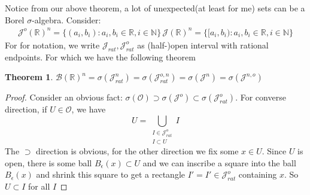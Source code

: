 \documentclass{article}
\newtheorem{theorem}{Theorem}[section]
\theoremstyle{definition}
\newcommand{\m}[1]{$ #1 $}
\begin{document}
Notice from our above theorem, a lot of unexpected(at least for me) sets can be a Borel \m{\sigma}-algebra. Consider: 
\begin{align*}
	\mathscr{J}^{o}(\mathbb{R})^{n} = \{(a_i,b_i):a_i,b_i \in \mathbb{R}, i \in \mathbb{N}\} \,
        \mathscr{J}(\mathbb{R})^{n} = \{[a_i,b_i):a_i,b_i \in \mathbb{R}, i \in \mathbb{N}\} 
\end{align*}
For for notation, we write \m{\mathscr{J}_{rat},\mathscr{J}^{o}_{rat}} as (half-)open interval with rational endpoints. For which we have the following theorem
\begin{theorem}
	\m{\mathscr{B}(\mathbb{R})^n = \sigma(\mathscr{J}^{n}_{rat}) =  \sigma(\mathscr{J}^{o,n}_{rat}) =  \sigma(\mathscr{J}^{n}) =  \sigma(\mathscr{J}^{n,o}) }
\end{theorem}
\begin{proof}
	Consider an obvious fact: \m{\sigma(\mathscr{O}) \supset \sigma(\mathscr{J}^{o}) \subset \sigma(\mathscr{J}^{o}_{rat}) }. For converse direction, if \m{U \in \mathscr{O}}, we have 
	\begin{equation*}
		U = \bigcup_{\substack{I \in \mathscr{J}^{o}_{rat} \\ I \subset U}} I
	\end{equation*}
	The \m{ \supset} direction is obvious, for the other direction we fix some \m{x \in U}. Since \m{U} is open, there is some ball \m{ B_{\epsilon}(x) \subset U} and we can inscribe a square into the ball \m{ B_{\epsilon}(x)} and shrink this square to get a rectangle \m{ I' = I' \in \mathscr{J}^o_{rat}} containing \m{x}. So \m{U \subset I} for all \m{I}
\end{proof}
\end{document}
